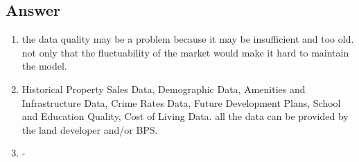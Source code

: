 \documentclass[12pt,titlepage]{article}
\begin{document}
\subsection*{Answer}
\begin{enumerate}
    \item the data quality may be a problem because it may be insufficient and too old. not only that the fluctuability of the market would make it hard to maintain the model.
    \item Historical Property Sales Data, Demographic Data, Amenities and Infrastructure Data, Crime Rates Data, Future Development Plans, School and Education Quality, Cost of Living Data. all the data can be provided by the land developer and/or BPS.
    \item -\\
\end{enumerate}
\end{document}

